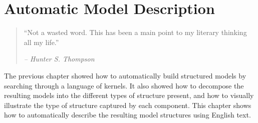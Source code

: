 
\inbpdocument


\chapter{Automatic Model Description}
\label{ch:description}












\begin{quotation}
``Not a wasted word.
This has been a main point to my literary thinking all my life.''

\hspace*{\fill} \emph{ -- Hunter S. Thompson}
\end{quotation}



The previous chapter showed how to automatically build structured models by searching through a language of kernels.
It also showed how to decompose the resulting models into the different types of structure present, and how to visually illustrate the type of structure captured by each component.
This chapter shows how to automatically describe the resulting model structures using English text.

